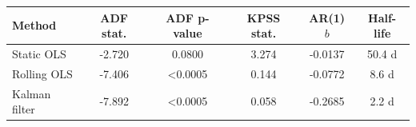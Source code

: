 \begin{tabular}{lccccc}
\toprule
Method & ADF stat. & ADF p-value & KPSS stat. & AR(1) $b$ & Half-life\\
\midrule
Static OLS & -2.720 & 0.0800 & 3.274 & -0.0137 & 50.4 d\\
Rolling OLS & -7.406 & <0.0005 & 0.144 & -0.0772 & 8.6 d\\
Kalman filter & -7.892 & <0.0005 & 0.058 & -0.2685 & 2.2 d\\
\bottomrule
\end{tabular}
